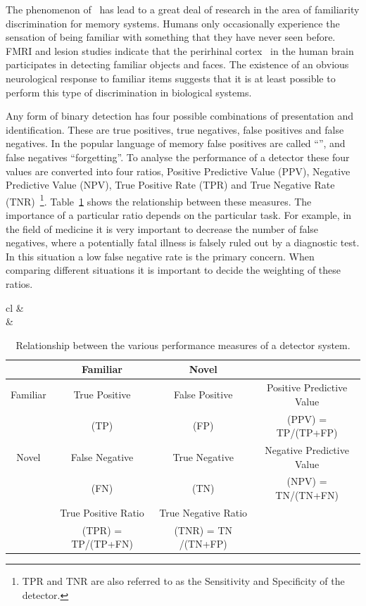 The phenomenon of \dejavu\ has lead to a great deal of research in the area of familiarity discrimination for memory systems.  Humans only occasionally experience the sensation of being familiar with something that they have never seen before.  FMRI and lesion studies indicate that the perirhinal cortex~\citep{Brown1998,Squire2004} in the human brain participates in detecting familiar objects and faces.  The existence of an obvious neurological response to familiar items suggests that it is at least possible to perform this type of discrimination in biological systems.

Any form of binary detection has four possible combinations of presentation and identification.  These are true positives, true negatives, false positives and false negatives.  In the popular language of memory false positives are called ``\dejavu'', and false negatives ``forgetting''.  To analyse the performance of a detector these four values are converted into four ratios,  Positive Predictive Value (PPV), Negative Predictive Value (NPV), True Positive Rate (TPR) and True Negative Rate (TNR)~\footnote{TPR and TNR are also referred to as the Sensitivity and Specificity of the detector.}. Table~\ref{tab:FamDetection} shows the relationship between these measures.  The importance of a particular ratio depends on the particular task. For example, in the field of medicine it is very important to decrease the number of false negatives, where a potentially fatal illness is falsely ruled out by a diagnostic test.  In this situation a low false negative rate is the primary concern.  When comparing different situations it is important to decide the weighting of these ratios.

\begin{table}[tbp]
\center
\begin{footnotesize}
\begin{tabular}{cl}
&\hspace{4cm}{Presentation} \\
&
	\begin{tabular}{c|cc|c}
		&Familiar&Novel\\
		\hline
		Familiar&True Positive&False Positive	&Positive Predictive Value\\
						&	(TP)				&  (FP)			  	&	(PPV) = TP/(TP+FP)\\
		Novel		&False Negative&True Negative	&Negative Predictive Value\\
						& (FN)				&	(TN) 					&	(NPV) = TN/(TN+FN)\\
						\hline
						&True Positive Ratio 	&	True Negative Ratio &\\
						&(TPR) = TP/(TP+FN)		  & (TNR) = TN /(TN+FP) &\\ 
	\end{tabular}
\end{tabular}
\end{footnotesize}
\caption{Relationship between the various performance measures of a detector system.}
\label{tab:FamDetection}
\end{table}


